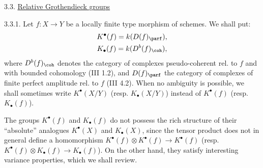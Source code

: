%
3.3. \uline{Relative Grothendieck groups}

3.3.1. Let \(f:X\longrightarrow Y\) be a locally finite type morphism of schemes. We shall put:
\[
\begin{gathered}
 K^{\bullet}(f)=k(D(f)_{\parf}),\\
 K_{\bullet}(f)=k(D^b(f)_{\coh}),
\end{gathered}
\]
where \(D^b(f)_{\coh}\) denotes the category of complexes pseudo-coherent rel. to \(f\) and with bounded cohomology (III 1.2), and \(D(f)_{\parf}\) the category of complexes of finite perfect amplitude rel. to \(f\) (III 4.2). When no ambiguity is possible, we shall sometimes write \(K^{\bullet}(X/Y)\) (resp. \(K_{\bullet}(X/Y)\)) instead of \(K^{\bullet}(f)\) (resp. \(K_{\bullet}(f)\)).

The groups \(K^{\bullet}(f)\) and \(K_{\bullet}(f)\) do not possess the rich structure of their ``absolute'' analogues \(K^{\bullet}(X)\) and \(K_{\bullet}(X)\), since the tensor product does not in general define a homomorphism \(K^{\bullet}(f)\otimes K^{\bullet}(f)\longrightarrow K^{\bullet}(f)\) (resp. \(K^{\bullet}(f)\otimes K_{\bullet}(f)\longrightarrow K_{\bullet}(f)\)). On the other hand, they satisfy interesting variance properties, which we shall review.


